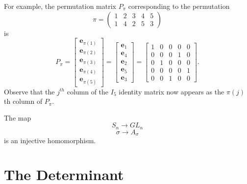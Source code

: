 \documentclass[12pt]{article}
\theoremstyle{definition}
\theoremstyle{remark}
\begin{document}
\begin{example}
    For example, the permutation matrix $P_{\pi}$ corresponding to the permutation 
    $$\pi=\begin{pmatrix} 1 & 2 & 3 & 4 & 5 \\ 1 & 4 & 2 & 5 & 3 \end{pmatrix}$$
    is
    $$ P_{\pi} = 
    \begin{bmatrix}
    \mathbf{e}_{\pi(1)} \\
    \mathbf{e}_{\pi(2)} \\
    \mathbf{e}_{\pi(3)} \\
    \mathbf{e}_{\pi(4)} \\
    \mathbf{e}_{\pi(5)} 
    \end{bmatrix}
    =
    \begin{bmatrix}
    \mathbf{e}_{1} \\
    \mathbf{e}_{4} \\
    \mathbf{e}_{2} \\
    \mathbf{e}_{5} \\
    \mathbf{e}_{3} 
    \end{bmatrix}
    =
    \begin{bmatrix} 
    1 & 0 & 0 & 0 & 0 \\
    0 & 0 & 0 & 1 & 0 \\
    0 & 1 & 0 & 0 & 0 \\
    0 & 0 & 0 & 0 & 1 \\
    0 & 0 & 1 & 0 & 0 
    \end{bmatrix}.
    $$
    Observe that the $j^{th}$ column of the $I_5$ identity matrix now appears as the $\pi(j)$th column of $P_{\pi}$.
     

\end{example}
\begin{proposition}
    The map 
    $$S_n \rightarrow GL_n$$
    $$\sigma \rightarrow A_\sigma$$
    is an injective homomorphism. 
\end{proposition}
\section{The Determinant}
\end{document}
